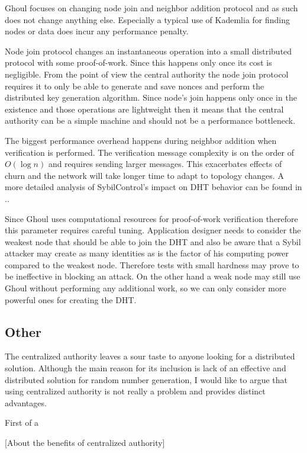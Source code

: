   Ghoul focuses on changing node join and neighbor addition protocol and as
  such does not change anything else. Especially a typical use of Kademlia for
  finding nodes or data does incur any performance penalty.

  Node join protocol changes an instantaneous operation into a small distributed
  protocol with some proof-of-work. Since this happens only once its cost is
  negligible. From the point of view the central authority the node join
  protocol requires it to only be able to generate and save nonces and perform
  the distributed key generation algorithm. Since node's join happens only once
  in the existence and those operations are lightweight then it means that the
  central authority can be a simple machine and should not be a performance
  bottleneck.

  The biggest performance overhead happens during neighbor addition when
  verification is performed. The verification message complexity is on the order
  of $O(\log n)$ and requires sending larger messages. This exacerbates effects
  of churn and the network will take longer time to adapt to topology changes.
  A more detailed analysis of SybilControl's impact on DHT behavior can be
  found in \cite{li12}..

  Since Ghoul uses computational resources for proof-of-work verification
  therefore this parameter requires careful tuning. Application designer needs
  to consider the weakest node that should be able to join the DHT and also be
  aware that a Sybil attacker may create as many identities as is the factor
  of his computing power compared to the weakest node. Therefore tests with
  small hardness may prove to be ineffective in blocking an attack. On the other
  hand a weak node may still use Ghoul without performing any additional work,
  so we can only consider more powerful ones for creating the DHT.

  \subsection{Other}

  The centralized authority leaves a sour taste to anyone looking for a
  distributed solution. Although the main reason for its inclusion is lack of
  an effective and distributed solution for random number generation, I would
  like to argue that using centralized authority is not really a problem and
  provides distinct advantages.

  First of a


  [About the benefits of centralized authority]
